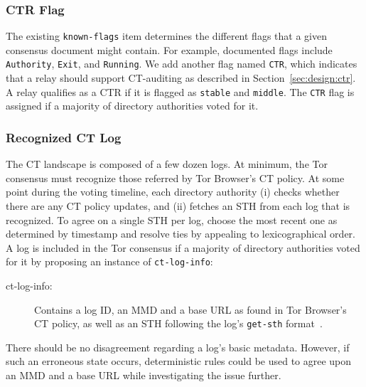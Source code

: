 \subsubsection{CTR Flag}
The existing \texttt{known-flags} item determines the different flags that a
given consensus document might contain.  For example, documented flags include
\texttt{Authority}, \texttt{Exit}, and \texttt{Running}.  We add another flag
named \texttt{CTR}, which indicates that a relay should support CT-auditing as
described in Section~\ref{sec:design:ctr}.  A relay qualifies as a CTR if it is
flagged as \texttt{stable} and \texttt{middle}.  The \texttt{CTR} flag is
assigned if a majority of directory authorities voted for it.


\subsubsection{Recognized CT Log}
The CT landscape is composed of a few dozen logs.  At minimum, the Tor
consensus must recognize those referred by Tor Browser's CT policy.  At some
point during the voting timeline, each directory authority
(i) checks whether there are any CT policy updates, and
(ii) fetches an STH from each log that is recognized.
To agree on a single STH per log, choose the most recent one as determined by
timestamp and resolve ties by appealing to lexicographical order.  A log is
included in the Tor consensus if a majority of directory authorities voted
for it by proposing an instance of \texttt{ct-log-info}:
\begin{description}
	\item[ct-log-info:] Contains a log ID, an MMD and a base URL as found in
		Tor Browser's CT policy, as well as an STH following the log's
		\texttt{get-sth} format~\cite{ct,ct/bis}.
\end{description}

There should be no disagreement regarding a log's basic metadata.  However, if
such an erroneous state occurs, deterministic rules could be used to agree upon
an MMD and a base URL while investigating the issue further.


